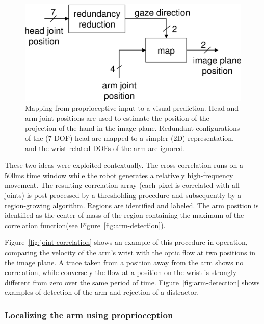 \ifverbose
\begin{figure}[tb]
\begin{center}
\includegraphics[width=\columnwidth]{mapping-reach.eps}
\caption{ 
\label{fig:mapping-reach}
%
Mapping from proprioceptive input to a visual prediction. Head and arm
joint positions are used to estimate the position of the projection of
the hand in the image plane.  Redundant configurations of the (7 DOF)
head are mapped to a simpler (2D) representation, and the wrist-related 
DOFs of the arm are ignored.
%
}
\end{center}
\end{figure}
\endif
\fi

\ifverbose
These two ideas were exploited contextually. The cross-correlation
runs on a 500ms time window while the robot generates a relatively
high-frequency movement. The resulting correlation array (each pixel
is correlated with all joints) is post-processed by a thresholding
procedure and subsequently by a region-growing algorithm. Regions are
identified and labeled. The arm position is identified as the center
of mass of the region containing the maximum of the correlation
function\iflong (see Figure~\ref{fig:arm-detection})\fi.
\fi

Figure~\ref{fig:joint-correlation} shows an example of this procedure
in operation, comparing the velocity of the arm's wrist with the optic
flow at two positions in the image plane.  A trace taken from a
position away from the arm shows no correlation, while conversely the
flow at a position on the wrist is strongly different from zero over
the same period of time.  Figure~\ref{fig:arm-detection} shows
examples of detection of the arm and rejection of a distractor.


\subsubsection*{Localizing the arm using proprioception}

